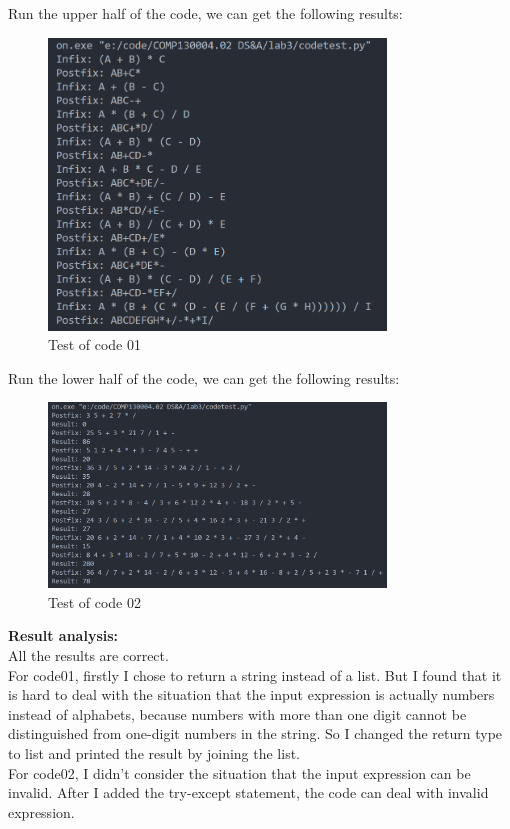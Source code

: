 \documentclass[UTF8]{ctexart}
\begin{document}
Run the upper half of the code, we can get the following results:
\begin{figure}[H]
    \centering
    \includegraphics[width=0.8\textwidth]{code1result.png}
    \caption{Test of code 01}
\end{figure}
Run the lower half of the code, we can get the following results:
\begin{figure}[H]
    \centering
    \includegraphics[width=0.8\textwidth]{code2result.png}
    \caption{Test of code 02}
\end{figure}
\textbf{Result analysis:} \\
All the results are correct.\\
For code01, firstly I chose to return a string instead of a list. 
But I found that it is hard to deal with the situation that the input expression is actually numbers instead of alphabets, because numbers with more than one digit cannot be distinguished from one-digit numbers in the string.
So I changed the return type to list and printed the result by joining the list.\\
For code02, I didn't consider the situation that the input expression can be invalid. After I added the try-except statement, the code can deal with invalid expression.
\end{document}
